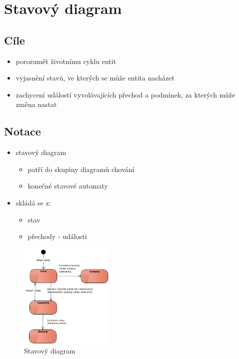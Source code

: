 \documentclass{szzclass}
\begin{document}
\section{Stavový diagram}
\subsection{Cíle}
\begin{itemize}
    \item porozumět životnímu cyklu entit
    \item vyjasnění stavů, ve kterých se může entita nacházet
    \item zachycení událostí vyvolávajících přechod a podmínek, za kterých může změna nastat
\end{itemize}

\subsection{Notace}
\begin{itemize}
    \item stavový diagram
    \begin{itemize}
        \item patří do skupiny diagramů chování
        \item konečné stavové automaty
    \end{itemize}
    \item skládá se z:
    \begin{itemize}
        \item stav
        \item přechody - události
    \end{itemize}
\end{itemize}
\begin{figure}[h!]
    \centering
    \includegraphics[width=0.4\textwidth]{topics/bi-spol-31/images/entityState.png}
    \caption{Stavový diagram}
\end{figure}
\end{document}
